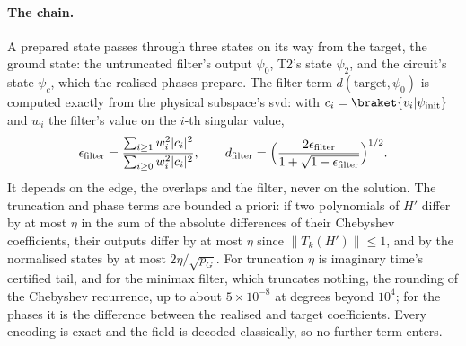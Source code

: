 \paragraph{The chain.} A prepared state passes through three states on its way from the target, the ground state: the untruncated filter's output $\psi_0$, T2's state $\psi_2$, and the circuit's state $\psi_c$, which the realised phases prepare. The filter term $d(\text{target},\psi_0)$ is computed exactly from the physical subspace's \gls{svd}: with $c_i=\braket{v_i|\psi_{\mathrm{init}}}$ and $w_i$ the filter's value on the $i$-th singular value,
\begin{equation*}
    \epsilon_{\mathrm{filter}}=\frac{\sum_{i\ge1}w_i^2|c_i|^2}{\sum_{i\ge0}w_i^2|c_i|^2},
    \qquad
    d_{\mathrm{filter}}=\Bigl(\frac{2\epsilon_{\mathrm{filter}}}{1+\sqrt{1-\epsilon_{\mathrm{filter}}}}\Bigr)^{1/2}.
\end{equation*}
It depends on the edge, the overlaps and the filter, never on the solution. The truncation and phase terms are bounded a priori: if two polynomials of $H'$ differ by at most $\eta$ in the sum of the absolute differences of their Chebyshev coefficients, their outputs differ by at most $\eta$ since $\|T_k(H')\|\le1$, and by  the normalised states by at most $2\eta/\sqrt{p_G}$. For truncation $\eta$ is imaginary time's certified tail, and for the minimax filter, which truncates nothing, the rounding of the Chebyshev recurrence, up to about $5\times10^{-8}$ at degrees beyond $10^4$; for the phases it is the difference between the realised and target coefficients. Every encoding is exact and the field is decoded classically, so no further term enters.

